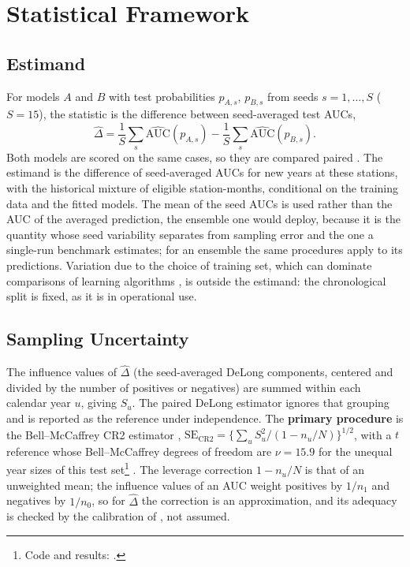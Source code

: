 \documentclass[11pt,a4paper]{article}
\begin{document}
\section{Statistical Framework}
\label{sec:framework}

\subsection{Estimand}
\label{sec:estimand}

For models $A$ and $B$ with test probabilities $p_{A,s}$, $p_{B,s}$ from seeds $s=1,\dots,S$ ($S=15$), the statistic is the difference between seed-averaged test AUCs,
\begin{equation}
\hat\Delta=\frac1S\sum_{s}\widehat{\mathrm{AUC}}(p_{A,s})-\frac1S\sum_{s}\widehat{\mathrm{AUC}}(p_{B,s}).
\end{equation}
Both models are scored on the same cases, so they are compared paired \citep{diebold1995,delsole2014}. The estimand is the difference of seed-averaged AUCs for new years at these stations, with the historical mixture of eligible station-months, conditional on the training data and the fitted models. The mean of the seed AUCs is used rather than the AUC of the averaged prediction, the ensemble one would deploy, because it is the quantity whose seed variability  separates from sampling error and the one a single-run benchmark estimates; for an ensemble the same procedures apply to its predictions. Variation due to the choice of training set, which can dominate comparisons of learning algorithms \citep{bates2024}, is outside the estimand: the chronological split is fixed, as it is in operational use.

\subsection{Sampling Uncertainty}
\label{sec:sampling}

The influence values of $\hat\Delta$ (the seed-averaged DeLong components, centered and divided by the number of positives or negatives) are summed within each calendar year $u$, giving $S_u$. The paired DeLong estimator \citep{delong1988} ignores that grouping and is reported as the reference under independence. The \textbf{primary procedure} is the Bell--McCaffrey CR2 estimator \citep{bell2002}, $\text{SE}_{\text{CR2}}=\{\sum_u S_u^2/(1-n_u/N)\}^{1/2}$, with a $t$ reference whose Bell--McCaffrey degrees of freedom are $\nu=15.9$ for the unequal year sizes of this test set\footnote{Code and results: .} \citep{pustejovsky2018,mackinnon2023}. The leverage correction $1-n_u/N$ is that of an unweighted mean; the influence values of an AUC weight positives by $1/n_1$ and negatives by $1/n_0$, so for $\hat\Delta$ the correction is an approximation, and its adequacy is checked by the calibration of , not assumed.
\end{document}
